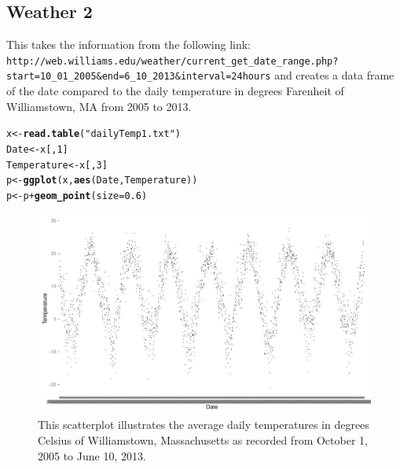 \documentclass{article}\usepackage{graphicx, color}
\makeatletter
\def\maxwidth{ %
  \ifdim\Gin@nat@width>\linewidth
    \linewidth
  \else
    \Gin@nat@width
  \fi
}
\newcommand{\hlfunctioncall}[1]{\textcolor[rgb]{0.501960784313725,0,0.329411764705882}{\textbf{#1}}}%
\newcommand{\hlstring}[1]{\textcolor[rgb]{0.6,0.6,1}{#1}}%
\newenvironment{kframe}{%
 \def\at@end@of@kframe{}%
 \ifinner\ifhmode%
  \def\at@end@of@kframe{\end{minipage}}%
  \begin{minipage}{\columnwidth}%
 \fi\fi%
 \def\FrameCommand##1{\hskip\@totalleftmargin \hskip-\fboxsep
 \colorbox{shadecolor}{##1}\hskip-\fboxsep
     \hskip-\linewidth \hskip-\@totalleftmargin \hskip\columnwidth}%
 \MakeFramed {\advance\hsize-\width
   \@totalleftmargin\z@ \linewidth\hsize
   \@setminipage}}%
 {\par\unskip\endMakeFramed%
 \at@end@of@kframe}
\newenvironment{knitrout}{}{} %
\makeatother
\begin{document}
\subsection*{Weather 2}
This takes the information from the following link:
\verb+http://web.williams.edu/weather/current_get_date_range.php?start=10_01_2005&end=6_10_2013&interval=24hours+
and creates a data frame of the date compared to the daily temperature
in degrees Farenheit of Williamstown, MA from 2005 to 2013.

\begin{knitrout}
\color{fgcolor}\begin{kframe}
\begin{alltt}
x <- \hlfunctioncall{read.table}(\hlstring{"dailyTemp1.txt"})
Date <- x[, 1]
Temperature <- x[, 3]
p <- \hlfunctioncall{ggplot}(x, \hlfunctioncall{aes}(Date, Temperature))
p <- p + \hlfunctioncall{geom_point}(size = 0.6)
\end{alltt}
\end{kframe}
\end{knitrout}


\begin{landscape}
  \begin{figure}
\begin{knitrout}
\color{fgcolor}
\includegraphics[width=\maxwidth]{figure/graph2Landscape} 

\end{knitrout}


\caption{This scatterplot illustrates the average daily temperatures in
  degrees Celsius of Williamstown, Massachusetts as recorded from
  October 1, 2005 to June 10,  2013.}
\end{figure}
\end{landscape}
\end{document}
